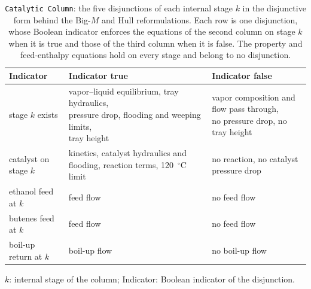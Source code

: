 \begin{table}[htbp]
\centering
\caption{\texttt{Catalytic Column}: the five disjunctions of each internal stage \(k\) in the disjunctive form behind the Big-\(M\) and Hull reformulations.
Each row is one disjunction, whose Boolean indicator enforces the equations of the second column on stage \(k\) when it is true and those of the third column when it is false.
The property and feed-enthalpy equations hold on every stage and belong to no disjunction.}
\label{tab:supp-catdist-disjunctions}
\footnotesize
\begin{threeparttable}
\begin{tabular}{@{}lll@{}}\toprule
Indicator & Indicator true & Indicator false\\\midrule
stage \(k\) exists & \makecell[l]{vapor--liquid equilibrium, tray hydraulics,\\pressure drop, flooding and weeping limits,\\tray height} & \makecell[l]{vapor composition and flow pass through,\\no pressure drop, no tray height} \\
catalyst on stage \(k\) & \makecell[l]{kinetics, catalyst hydraulics and flooding,\\reaction terms, 120~\(^\circ\)C limit} & no reaction, no catalyst pressure drop \\
ethanol feed at \(k\) & feed flow & no feed flow \\
butenes feed at \(k\) & feed flow & no feed flow \\
boil-up return at \(k\) & boil-up flow & no boil-up flow \\
\bottomrule
\end{tabular}
\begin{tablenotes}[flushleft]\footnotesize
\item \(k\): internal stage of the column; Indicator: Boolean indicator of the disjunction.
\end{tablenotes}
\end{threeparttable}
\end{table}

